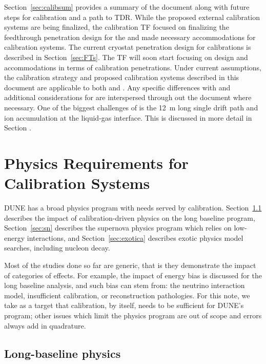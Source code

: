 Section~\ref{sec:calibsum} provides a summary of the document along with future steps for calibration and a path to TDR.  While the proposed external calibration systems are being finalized, the calibration TF 
focused on finalizing the feedthrough penetration design for the  and made necessary accommodations for calibration systems. The current cryostat penetration design for   calibrations is described in Section~\ref{sec:FTs}. The TF will soon start focusing on   design and accommodations in terms of calibration penetrations. Under current assumptions, the calibration strategy and proposed calibration systems described in this document are applicable to both  and . Any specific differences with  and additional considerations for    are interspersed through out the document where necessary. One of the biggest challenges of  is the \SI{12}{\m} long single drift path and ion accumulation at the liquid-gas interface. This is discussed in more detail in Section . 
    
\section{Physics Requirements for Calibration Systems}
\label{sec:calibphys} %

 DUNE has a broad physics program with needs served by calibration. Section~\ref{sec:lbl} describes the impact of calibration-driven physics on the long baseline program, Section~\ref{sec:sn} describes the supernova physics program which relies on low-energy interactions, and Section~\ref{sec:exotica} describes exotic physics model searches, including nucleon decay. 
 
 Most of the studies done so far are generic, that is they demonstrate the impact of categories of effects. For example, the impact of energy bias is discussed for the long baseline analysis, and such bias can stem from: the neutrino interaction model, insufficient calibration, or reconstruction pathologies. For this note, we take as a target that calibration, by itself, needs to be sufficient for DUNE's program; other issues which limit the physics program are out of scope and errors always add in quadrature. 
 
\subsection{Long-baseline physics }\label{sec:lbl}

